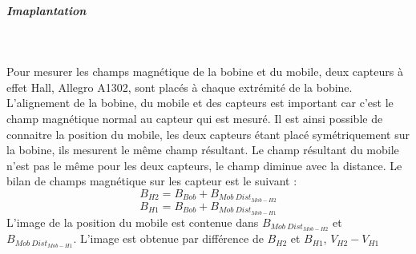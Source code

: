 \documentclass[11pt, french]{article} %
\begin{document}
\subparagraph*{Imaplantation}~\\
\begin{minipage}[t]{10cm}
Pour mesurer les champs magnétique de la bobine et du mobile, deux capteurs à effet Hall, Allegro A1302, sont placés à chaque extrémité de la bobine. L'alignement de la bobine, du mobile et des capteurs est important car c'est le champ magnétique normal au capteur qui est mesuré. Il est ainsi possible de connaitre la position du mobile, les deux capteurs étant placé symétriquement sur la bobine, ils mesurent le même champ résultant. Le champ résultant du mobile n'est pas le même pour les deux capteurs, le champ diminue avec la distance. Le bilan de champs magnétique sur les capteur est le suivant :
\vspace{-0.3cm} \[B_{H2} = B_{Bob} + B_{Mob~Dist_{Mob-H2}}\]
\vspace{-0.8cm} \[B_{H1} = B_{Bob} + B_{Mob~Dist_{Mob-H1}}\]
L'image de la position du mobile est contenue dans  $B_{Mob~Dist_{Mob-H2}}$ et $B_{Mob~Dist_{Mob-H1}}$. L'image est obtenue par différence de $B_{H2}$ et $B_{H1}$, $V_{H2}-V_{H1}$
\end{minipage}
~
\begin{minipage}[t]{8cm}
\vspace{-7cm}
\end{minipage}
\end{document}
